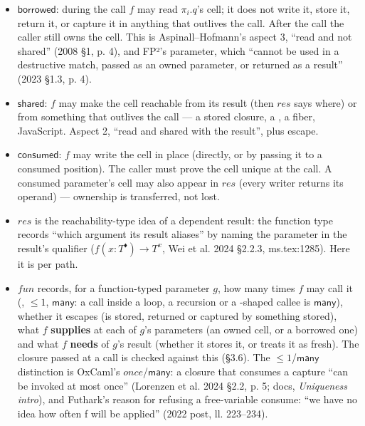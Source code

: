 \begin{itemize}
\item \textbf{$\mathsf{borrowed}$}: during the call $f$ may read $\pi _{i}.q$'s cell; it does not write it, store it, return it, or capture it in anything that outlives the call. After the call the caller still owns the cell. This is Aspinall–Hofmann's aspect 3, “read and not shared” (2008 §1, p. 4), and FP²'s \code{\^{}} parameter, which “cannot be used in a destructive match, passed as an owned parameter, or returned as a result” (2023 §1.3, p. 4).
\item \textbf{$\mathsf{shared}$}: $f$ may make the cell reachable from its result (then $\mathit{res}$ says where) or from something that outlives the call — a stored closure, a , a fiber, JavaScript. Aspect 2, “read and shared with the result”, plus escape.
\item \textbf{$\mathsf{consumed}$}: $f$ may write the cell in place (directly, or by passing it to a consumed position). The caller must prove the cell unique at the call. A consumed parameter's cell may also appear in $\mathit{res}$ (every  writer returns its operand) — ownership is transferred, not lost.
\item \textbf{$\mathit{res}$} is the reachability-type idea of a dependent result: the function type records “which argument its result aliases” by naming the parameter in the result's qualifier ($f(x:T^{\blacklozenge})\to T^{x}$, Wei et al. 2024 §2.2.3, ms.tex:1285). Here it is per path.
\item \textbf{$\mathit{fun}$} records, for a function-typed parameter $g$, how many times $f$ may call it (, $\le 1$, $\mathsf{many}$: a call inside a loop, a recursion or a -shaped callee is $\mathsf{many}$), whether it escapes (is stored, returned or captured by something stored), what $f$ \textbf{supplies} at each of $g$'s parameters (an owned cell, or a borrowed one) and what $f$ \textbf{needs} of $g$'s result (whether it stores it, or treats it as fresh). The closure passed at a call is checked against this (§3.6). The $\le 1$/$\mathsf{many}$ distinction is OxCaml's $\mathit{once}$/$\mathsf{many}$: a closure that consumes a capture “can be invoked at most once” (Lorenzen et al. 2024 §2.2, p. 5; docs, \emph{Uniqueness intro}), and Futhark's reason for refusing a free-variable consume: “we have no idea how often f will be applied” (2022 post, ll. 223–234).
\end{itemize}

